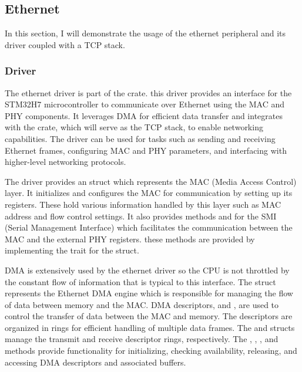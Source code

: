 \subsection{Ethernet}

In this section, I will demonstrate the usage of the ethernet peripheral and its driver coupled with a TCP stack.

\subsubsection{Driver}

The ethernet driver is part of the  crate. this driver provides an interface for the STM32H7 microcontroller to communicate over Ethernet using the MAC and PHY components. It leverages DMA for efficient data transfer and integrates with the  crate, which will serve as the TCP stack, to enable networking capabilities. The driver can be used for tasks such as sending and receiving Ethernet frames, configuring MAC and PHY parameters, and interfacing with higher-level networking protocols.

The driver provides an  struct which represents the MAC (Media Access Control) layer. It initializes and configures the MAC for communication by setting up its registers. These hold various information handled by this layer such as MAC address and flow control settings. It also provides methods  and  for the SMI (Serial Management Interface) which facilitates the communication between the MAC and the external PHY registers. these methods are provided by implementing the  trait for the  struct.

DMA is extensively used by the ethernet driver so the CPU is not throttled by the constant flow of information that is typical to this interface. The  struct represents the Ethernet DMA engine which is responsible for managing the flow of data between memory and the MAC.
DMA descriptors,  and , are used to control the transfer of data between the MAC and memory. The descriptors are organized in rings for efficient handling of multiple data frames. The  and  structs manage the transmit and receive descriptor rings, respectively. The , , , and  methods provide functionality for initializing, checking availability, releasing, and accessing DMA descriptors and associated buffers.

